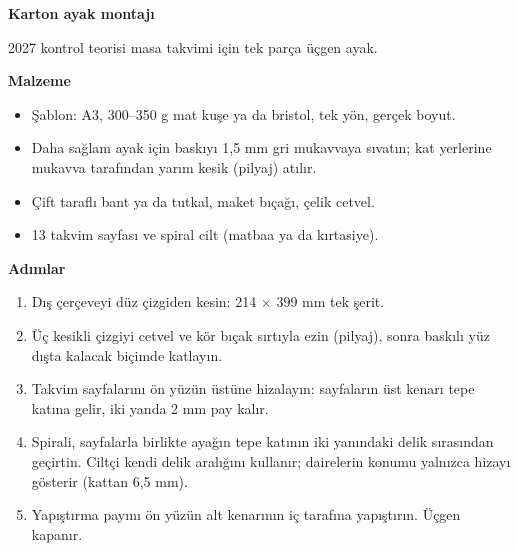 \documentclass[10pt]{article}
\begin{document}
\hspace*{30mm}\begin{minipage}[t][380mm][t]{237mm}
\vspace*{30mm}
{\Dar\bfseries\fontsize{40}{42}\selectfont\color{lacivert}Karton ayak montajı}\par\vspace{3mm}
{\fontsize{13}{17}\selectfont\color{yumusak}2027 kontrol teorisi masa takvimi için tek parça üçgen ayak.}\par
\vspace{12mm}

\begin{minipage}[t]{112mm}
\vspace{0pt}
\fontsize{12}{17}\selectfont\color{lacivert}
{\Dar\bfseries\fontsize{18}{20}\selectfont Malzeme}\par\vspace{2mm}
\begin{itemize}\setlength{\itemsep}{1mm}\setlength{\leftskip}{-4mm}
  \item Şablon: A3, 300--350 g mat kuşe ya da bristol, tek yön, gerçek boyut.
  \item Daha sağlam ayak için baskıyı 1,5 mm gri mukavvaya sıvatın; kat yerlerine mukavva tarafından yarım kesik (pilyaj) atılır.
  \item Çift taraflı bant ya da tutkal, maket bıçağı, çelik cetvel.
  \item 13 takvim sayfası ve spiral cilt (matbaa ya da kırtasiye).
\end{itemize}
\vspace{6mm}
{\Dar\bfseries\fontsize{18}{20}\selectfont Adımlar}\par\vspace{2mm}
\begin{enumerate}\setlength{\itemsep}{1.5mm}\setlength{\leftskip}{-4mm}
  \item Dış çerçeveyi düz çizgiden kesin: 214 $\times$ 399 mm tek şerit.
  \item Üç kesikli çizgiyi cetvel ve kör bıçak sırtıyla ezin (pilyaj), sonra baskılı yüz dışta kalacak biçimde katlayın.
  \item Takvim sayfalarını ön yüzün üstüne hizalayın: sayfaların üst kenarı tepe katına gelir, iki yanda 2 mm pay kalır.
  \item Spirali, sayfalarla birlikte ayağın tepe katının iki yanındaki delik sırasından geçirtin. Ciltçi kendi delik aralığını kullanır; dairelerin konumu yalnızca hizayı gösterir (kattan 6,5 mm).
  \item Yapıştırma payını ön yüzün alt kenarının iç tarafına yapıştırın. Üçgen kapanır.

\end{enumerate}
\end{minipage}
\end{minipage}
\end{document}
